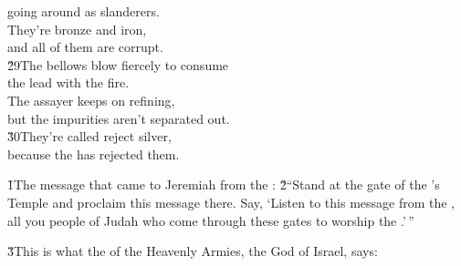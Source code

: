 \begin{poetry}
\poemll    going around as slanderers. \\
\poeml They're bronze and iron, \\
\poemll    and all of them are corrupt. \\
\poeml \v{29}The bellows blow fiercely to consume \\
\poemll    the lead with the fire. \\
\poeml The assayer keeps on refining, \\
\poemll    but the impurities aren't separated out. \\
\poeml \v{30}They're called reject silver, \\
\poemll    because the  has rejected them.
\end{poetry}

\v{1}The message that came to Jeremiah from the : \v{2}``Stand at the gate of the 's Temple and proclaim this message there. Say, `Listen to this message from the , all you people of Judah who come through these gates to worship the .'\,''

\v{3}This is what the  of the Heavenly Armies, the God of Israel, says:

